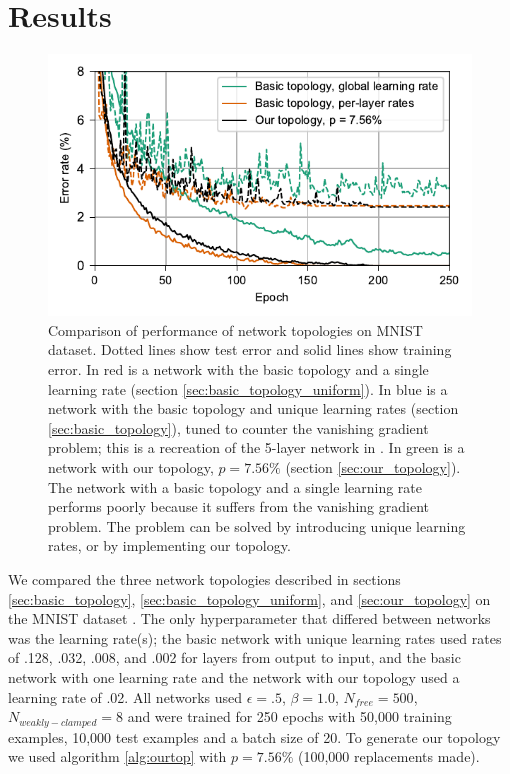 \documentclass[format=sigconf]{acmart}
\begin{document}
\section{Results}

\begin{figure}
  \centering
  \includegraphics[width=\columnwidth]{figures/MNIST_network_comparison.pdf}
  \caption{Comparison of performance of network topologies on MNIST dataset. Dotted lines show test error and solid lines show training error. In red is a network with the basic topology and a single learning rate (section \ref{sec:basic_topology_uniform}). In blue is a network with the basic topology and unique learning rates (section \ref{sec:basic_topology}), tuned to counter the vanishing gradient problem; this is a recreation of the 5-layer network in \cite{scellier17}. In green is a network with our topology, $p=7.56\%$ (section \ref{sec:our_topology}). The network with a basic topology and a single learning rate performs poorly because it suffers from the vanishing gradient problem. The problem can be solved by introducing unique learning rates, or by implementing our topology.}
  \label{fig:mnist_comparison}
\end{figure}

We compared the three network topologies described in sections \ref{sec:basic_topology}, \ref{sec:basic_topology_uniform}, and \ref{sec:our_topology} on the MNIST dataset \cite{mnist1998}. The only hyperparameter that differed between networks was the learning rate(s); the basic network with unique learning rates used rates of .128, .032, .008, and .002 for layers from output to input, and the basic network with one learning rate and the network with our topology used a learning rate of .02. All networks used $\epsilon=.5$, $\beta=1.0$, $N_{free}=500$, $N_{weakly-clamped}=8$ and were trained for 250 epochs with 50,000 training examples, 10,000 test examples and a batch size of 20. To generate our topology we used algorithm \ref{alg:ourtop} with $p=7.56\%$ (100,000 replacements made).
\end{document}

